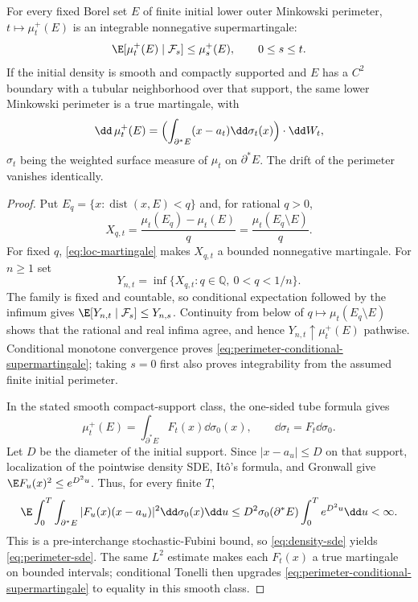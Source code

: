 \documentclass[../../main.tex]{subfiles}
\begin{document}
\begin{lemma}
\label{lem:perimeter-martingale}
For every fixed Borel set $E$ of finite initial lower outer Minkowski perimeter,
$t\mapsto\mu_t^+(E)$ is an integrable nonnegative supermartingale:
\begin{equation}\label{eq:perimeter-conditional-supermartingale}
  \E[\mu_t^+(E)\mid\mathcal F_s]\le\mu_s^+(E),\qquad 0\le s\le t.
\end{equation}
If the initial density is smooth and compactly supported and $E$ has a $C^2$ boundary with a
tubular neighborhood over that support, the same lower Minkowski perimeter is a true
martingale, with
\begin{equation}\label{eq:perimeter-sde}
  \dd\,\mu_t^+(E)=\Bigl(\int_{\partial^*E}(x-a_t)\dd\sigma_t(x)\Bigr)\cdot\dd W_t ,
\end{equation}
$\sigma_t$ being the weighted surface measure of $\mu_t$ on $\partial^*E$. The drift of the
perimeter vanishes identically.
\end{lemma}

\begin{proof}
Put $E_q=\{x:\operatorname{dist}(x,E)<q\}$ and, for rational $q>0$,
\[
  X_{q,t}=\frac{\mu_t(E_q)-\mu_t(E)}q
         =\frac{\mu_t(E_q\setminus E)}q.
\]
For fixed $q$, \eqref{eq:loc-martingale} makes $X_{q,t}$ a bounded nonnegative martingale. For
$n\ge1$ set
\[
  Y_{n,t}=\inf\{X_{q,t}:q\in\mathbb Q,\ 0<q<1/n\}.
\]
The family is fixed and countable, so conditional expectation followed by the infimum gives
$\E[Y_{n,t}\mid\mathcal F_s]\le Y_{n,s}$. Continuity from below of
$q\mapsto\mu_t(E_q\setminus E)$ shows that the rational and real infima agree, and hence
$Y_{n,t}\uparrow\mu_t^+(E)$ pathwise. Conditional monotone convergence proves
\eqref{eq:perimeter-conditional-supermartingale}; taking $s=0$ first also proves integrability
from the assumed finite initial perimeter.

In the stated smooth compact-support class, the one-sided tube formula gives
\[
  \mu_t^+(E)=\int_{\partial^*E}F_t(x)\dd\sigma_0(x),
  \qquad \dd\sigma_t=F_t\dd\sigma_0.
\]
Let $D$ be the diameter of the initial support. Since $|x-a_u|\le D$ on that support, localization
of the pointwise density SDE, It\^o's formula, and Gronwall give
$\E F_u(x)^2\le e^{D^2u}$. Thus, for every finite $T$,
\[
  \E\int_0^T\int_{\partial^*E}|F_u(x)(x-a_u)|^2
       \dd\sigma_0(x)\dd u
  \le D^2\sigma_0(\partial^*E)\int_0^T e^{D^2u}\dd u<\infty.
\]
This is a pre-interchange stochastic-Fubini bound, so \eqref{eq:density-sde} yields
\eqref{eq:perimeter-sde}. The same $L^2$ estimate makes each $F_t(x)$ a true martingale on
bounded intervals; conditional Tonelli then upgrades
\eqref{eq:perimeter-conditional-supermartingale} to equality in this smooth class.
\end{proof}
\end{document}
